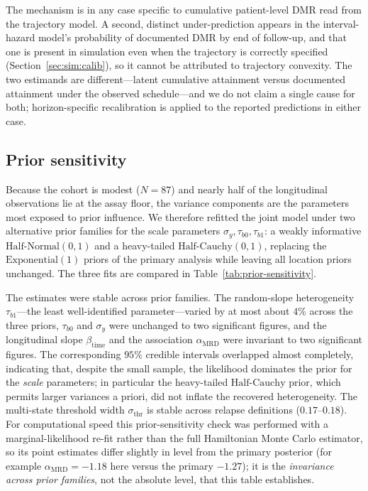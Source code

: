 \documentclass[11pt]{article}
\begin{document}
The mechanism is in any case specific to cumulative patient-level DMR read from the
trajectory model. A second, distinct under-prediction appears in the
interval-hazard model's probability of documented DMR by end of follow-up, and
that one is present in simulation even when the trajectory is correctly
specified (Section~\ref{sec:sim:calib}), so it cannot be attributed to
trajectory convexity. The two estimands are different---latent cumulative
attainment versus documented attainment under the observed schedule---and we do
not claim a single cause for both; horizon-specific recalibration is applied to
the reported predictions in either case.

\subsection{Prior sensitivity}
\label{sec:priorsens}

Because the cohort is modest ($N=87$) and nearly half of the longitudinal
observations lie at the assay floor, the variance components are the parameters
most exposed to prior influence. We therefore refitted the joint model under
two alternative prior families for the scale parameters
$\sigma_y,\tau_{b0},\tau_{b1}$: a weakly informative $\mathrm{Half\text{-}Normal}(0,1)$
and a heavy-tailed $\mathrm{Half\text{-}Cauchy}(0,1)$, replacing the
$\mathrm{Exponential}(1)$ priors of the primary analysis while leaving all
location priors unchanged. The three fits are compared in
Table~\ref{tab:prior-sensitivity}.

The estimates were stable across prior families. The random-slope heterogeneity
$\tau_{b1}$---the least well-identified parameter---varied by at most about
$4\%$ across the three priors, $\tau_{b0}$ and $\sigma_y$ were unchanged to two
significant figures, and the longitudinal slope $\beta_{\mathrm{time}}$ and the
association $\alpha_{\mathrm{MRD}}$ were invariant to two significant figures.
The corresponding $95\%$ credible intervals overlapped almost completely,
indicating that, despite the small sample, the likelihood dominates the prior
for the \emph{scale} parameters; in particular the heavy-tailed
$\mathrm{Half\text{-}Cauchy}$ prior, which permits larger variances a priori,
did not inflate the recovered heterogeneity. The multi-state threshold width
$\sigma_{\mathrm{thr}}$ is stable across
relapse definitions ($0.17$--$0.18$). For computational speed this prior-sensitivity
check was performed with a marginal-likelihood re-fit rather than the full
Hamiltonian Monte Carlo estimator, so its point estimates differ slightly in level
from the primary posterior (for example $\alpha_{\mathrm{MRD}}=-1.18$ here versus the
primary $-1.27$); it is the \emph{invariance across prior families}, not the absolute
level, that this table establishes.
\end{document}
